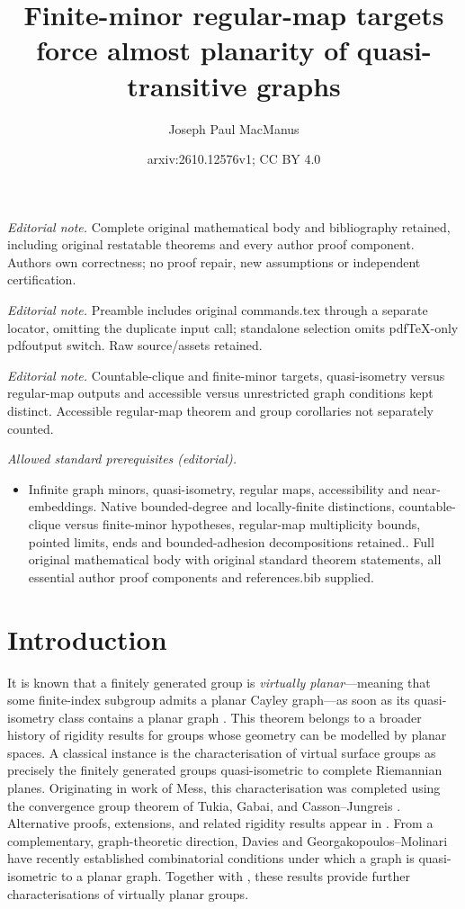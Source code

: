 \documentclass[10pt,a4paper]{amsart}
\title{Finite-minor regular-map targets force almost planarity of quasi-transitive graphs}
\author{Joseph Paul MacManus}
\date{arxiv:2610.12576v1; CC BY 4.0}
\theoremstyle{definition}
\begin{document}
\maketitle
\noindent\textit{Editorial note.} Complete original mathematical body and bibliography retained, including original restatable theorems and every author proof component. Authors own correctness; no proof repair, new assumptions or independent certification.\par\medskip
\noindent\textit{Editorial note.} Preamble includes original commands.tex through a separate locator, omitting the duplicate input call; standalone selection omits pdfTeX-only pdfoutput switch. Raw source/assets retained.\par\medskip
\noindent\textit{Editorial note.} Countable-clique and finite-minor targets, quasi-isometry versus regular-map outputs and accessible versus unrestricted graph conditions kept distinct. Accessible regular-map theorem and group corollaries not separately counted.\par\medskip
\noindent\textit{Allowed standard prerequisites (editorial).}\begin{itemize}
\item Infinite graph minors, quasi-isometry, regular maps, accessibility and near-embeddings. Native bounded-degree and locally-finite distinctions, countable-clique versus finite-minor hypotheses, regular-map multiplicity bounds, pointed limits, ends and bounded-adhesion decompositions retained.. Full original mathematical body with original standard theorem statements, all essential author proof components and references.bib supplied.
\end{itemize}\medskip
\section{Introduction}



It is known that a finitely generated group is \emph{virtually planar}---meaning that some finite-index subgroup admits a planar Cayley graph---as soon as its quasi-isometry class contains a planar graph \cite{macmanus2023accessibility}. This theorem belongs to a broader history of rigidity results for groups whose geometry can be modelled by planar spaces. A classical instance is the characterisation of virtual surface groups as precisely the finitely generated groups quasi-isometric to complete Riemannian planes. Originating in work of Mess, this characterisation was completed using the convergence group theorem of Tukia, Gabai, and Casson--Jungreis \cites{mess1988seifert,tukia1988homeomorphic,gabai1992convergence,casson1994convergence}. Alternative proofs, extensions, and related rigidity results appear in \cites{maillot2001quasi,bowditch2004planar,papasoglu2005quasi,macmanus2023accessibility,macmanus2024note,macmanus2025fat,macmanus2025vertex,mackay2026almost}. 
From a complementary, graph-theoretic direction, Davies \cite{davies2025string} and Georgakopoulos–Molinari \cite{georgakopoulos2026quasi} have recently established combinatorial conditions under which a graph is quasi-isometric to a planar graph. Together with \cite{macmanus2023accessibility}, these results provide further characterisations of virtually planar groups.
\end{document}
